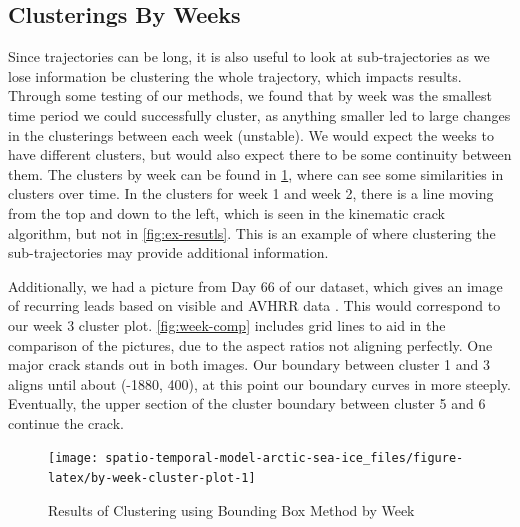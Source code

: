 \documentclass[12pt]{article}
\begin{document}
\hypertarget{clusterings-by-weeks}{%
\subsection{Clusterings By Weeks}\label{clusterings-by-weeks}}

Since trajectories can be long, it is also useful to look at
sub-trajectories as we lose information be clustering the whole
trajectory, which impacts results. Through some testing of our methods,
we found that by week was the smallest time period we could successfully
cluster, as anything smaller led to large changes in the clusterings
between each week (unstable). We would expect the weeks to have
different clusters, but would also expect there to be some continuity
between them. The clusters by week can be found in
\cref{fig:by-week-cluster-plot}, where can see some similarities in
clusters over time. In the clusters for week 1 and week 2, there is a
line moving from the top and down to the left, which is seen in the
kinematic crack algorithm, but not in \cref{fig:ex-resutls}. This is an
example of where clustering the sub-trajectories may provide additional
information.

Additionally, we had a picture from Day 66 of our dataset, which gives
an image of recurring leads based on visible and AVHRR data
\citep{eicken_sea_2015}. This would correspond to our week 3 cluster
plot. \cref{fig:week-comp} includes grid lines to aid in the comparison
of the pictures, due to the aspect ratios not aligning perfectly. One
major crack stands out in both images. Our boundary between cluster 1
and 3 aligns until about (-1880, 400), at this point our boundary curves
in more steeply. Eventually, the upper section of the cluster boundary
between cluster 5 and 6 continue the crack.

\begin{figure}[tbp]

{\centering \texttt{[image: spatio-temporal-model-arctic-sea-ice\_files/figure-latex/by-week-cluster-plot-1]} 

}

\caption{Results of Clustering using Bounding Box Method by Week}\label{fig:by-week-cluster-plot}
\end{figure}
\end{document}

